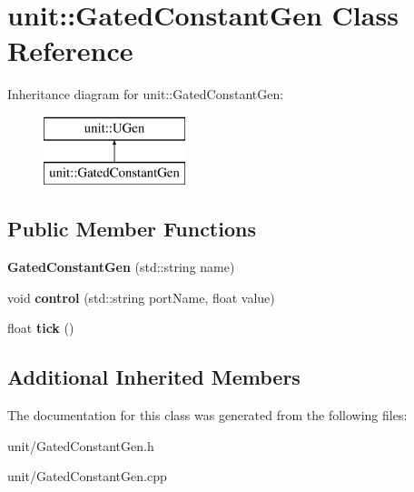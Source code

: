 \hypertarget{classunit_1_1GatedConstantGen}{}\section{unit\+:\+:Gated\+Constant\+Gen Class Reference}
\label{classunit_1_1GatedConstantGen}
Inheritance diagram for unit\+:\+:Gated\+Constant\+Gen\+:\begin{figure}[H]
\begin{center}
\leavevmode
\includegraphics[height=2.000000cm]{classunit_1_1GatedConstantGen}
\end{center}
\end{figure}
\subsection*{Public Member Functions}
\begin{DoxyCompactItemize}
\item 
{\bfseries Gated\+Constant\+Gen} (std\+::string name)\hypertarget{classunit_1_1GatedConstantGen_ad30ad26411f421228c8f7075b4d27f9a}{}\label{classunit_1_1GatedConstantGen_ad30ad26411f421228c8f7075b4d27f9a}

\item 
void {\bfseries control} (std\+::string port\+Name, float value)\hypertarget{classunit_1_1GatedConstantGen_a8365ddc2a6ddebc86e196fa381a5648d}{}\label{classunit_1_1GatedConstantGen_a8365ddc2a6ddebc86e196fa381a5648d}

\item 
float {\bfseries tick} ()\hypertarget{classunit_1_1GatedConstantGen_aafff659359fed9f28c703acd0076c081}{}\label{classunit_1_1GatedConstantGen_aafff659359fed9f28c703acd0076c081}

\end{DoxyCompactItemize}
\subsection*{Additional Inherited Members}


The documentation for this class was generated from the following files\+:\begin{DoxyCompactItemize}
\item 
unit/Gated\+Constant\+Gen.\+h\item 
unit/Gated\+Constant\+Gen.\+cpp\end{DoxyCompactItemize}
